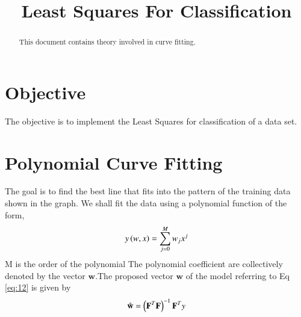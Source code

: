 \documentclass[journal,12pt,twocolumn]{IEEEtran}
\begin{document}
\makeatletter
{}
\makeatother
\let\StandardTheFigure\thefigure
\let\vec\mathbf
\renewcommand{\thefigure}{\theproblem}
\def\putbox#1#2#3{\makebox[0in][l]{\makebox[#1][l]{}\raisebox{\baselineskip}[0in][0in]{\raisebox{#2}[0in][0in]{#3}}}}
     \def\rightbox#1{\makebox[0in][r]{#1}}
     \def\centbox#1{\makebox[0in]{#1}}
     \def\topbox#1{\raisebox{-\baselineskip}[0in][0in]{#1}}
\vspace{3cm}
\title{Least Squares For Classification}
\maketitle
\newpage
\bigskip
\renewcommand{\thefigure}{\theenumi}
\renewcommand{\thetable}{\theenumi}
\begin{abstract}
This document contains theory involved in curve fitting.
\end{abstract}
\section{\textbf{Objective}}
The objective is to implement the Least Squares for classification of a data set.

\section{Polynomial Curve Fitting}
The goal is to find the best line that fits into the  pattern of the training data shown in the graph.
We shall fit the data using a polynomial function of the form, 
\begin{align}
     y\left(w,x\right)= \sum_{j=0}^{M} w_j x^{j}\\
\end{align}
M is the order of the polynomial
The polynomial coefficient are collectively denoted by the vector $\vec{w}$.The proposed vector $\vec{w}$ of the model referring to Eq \eqref{eq:12} is given by 
\begin{align}
    \hat{\vec{w}} = \brak{\vec{F}^T\vec{F}}^{-1}\vec{F}^Ty \label{eq:13}
\end{align}
\end{document}
